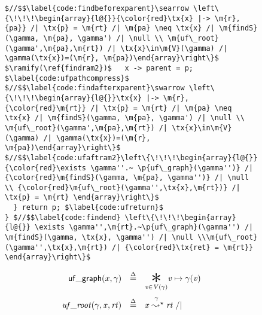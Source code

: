 \begin{figure}[t]
\begin{lstlisting}[multicols=2]
$//$$\label{code:findbeforexparent}\searrow \left\{\!\!\!\begin{array}{l@{}}{\color{red}\tx{x} |-> \m{r},{pa}} /| \tx{p} = \m{rt} /| \m{pa} \neq \tx{x} /| \m{findS}(\gamma, \m{pa}, \gamma') /| \null \\ \m{uf\_root}(\gamma',\m{pa},\m{rt}) /| \tx{x}\in\m{V}(\gamma) /| \gamma(\tx{x})=(\m{r}, \m{pa})\end{array}\right\}$
$\ramify(\ref{findram2})$   x -> parent = p; $\label{code:ufpathcompress}$
$//$$\label{code:findafterxparent}\swarrow \left\{\!\!\!\begin{array}{l@{}}\tx{x} |-> \m{r},{\color{red}\m{rt}} /| \tx{p} = \m{rt} /| \m{pa} \neq \tx{x} /| \m{findS}(\gamma, \m{pa}, \gamma') /| \null \\ \m{uf\_root}(\gamma',\m{pa},\m{rt}) /| \tx{x}\in\m{V}(\gamma) /| \gamma(\tx{x})=(\m{r}, \m{pa})\end{array}\right\}$
$//$$\label{code:ufaftram2}\left\{\!\!\!\begin{array}{l@{}} {\color{red}\exists \gamma''.~ \p{uf\_graph}(\gamma'')} /| {\color{red}\m{findS}(\gamma, \m{pa}, \gamma'')} /| \null \\ {\color{red}\m{uf\_root}(\gamma'',\tx{x},\m{rt})} /| \tx{p} = \m{rt} \end{array}\right\}$
  } return p; $\label{code:ufreturn}$
} $//$$\label{code:findend} \left\{\!\!\!\begin{array}{l@{}} \exists \gamma'',\m{rt}.~\p{uf\_graph}(\gamma'') /| \m{findS}(\gamma, \tx{x}, \gamma'') /| \null \\\m{uf\_root}(\gamma'',\tx{x},\m{rt}) /| {\color{red}\tx{ret} = \m{rt}}  \end{array}\right\}$
\end{lstlisting}
%
%
\vspace*{-1ex}
{\footnotesize
\begin{flushleft}
\begin{minipage}[c]{0.46\textwidth}
\vspace*{-1ex}
\begin{equation*}
\label{eqn:ufgraphdefn}
\begin{array}{@{}l@{}lcl@{}}
\multicolumn{2}{r}{\p{uf\_graph}(x, \gamma)} & \defeq & \underset{\m{v} \in \m{V}(\gamma)}{\bigstar} \m{v}	\mapsto\gamma(\m{v}) \\
[15pt]
\m{uf\_root}&(\gamma,\m{x},\m{rt}) & \defeq & \m{x} \mathrel{{\stackrel{\gamma~}{\leadsto^{\star}}}} \m{rt} \; /| \null \\ 

\end{array}
\end{equation*}
\end{minipage}
\end{flushleft}}
\end{figure}
